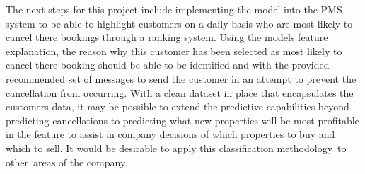 \vspace{5mm}
The next steps for this project include implementing the model into the PMS system to be able to highlight customers on a daily basis who are most likely to cancel there bookings through a ranking system. Using the models feature explanation, the reason why this customer has been selected as most likely to cancel there booking should be able to be identified and with the provided recommended set of messages to send the customer in an attempt to prevent the cancellation from occurring.
\vspace{5mm}
With a clean dataset in place that encapsulates the customers data, it may be possible to extend the predictive capabilities beyond predicting cancellations to predicting what new properties will be most profitable in the feature to assist in company decisions of which properties to buy and which to sell. It would be desirable to apply this classification methodology to other areas of the company.



